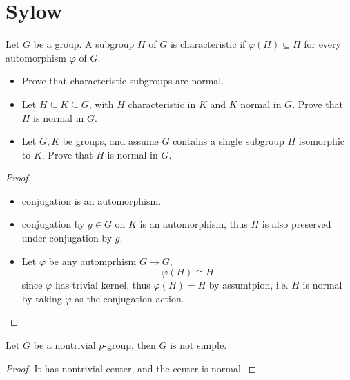 \documentclass[openany]{book}
\begin{document}
\section{Sylow}

\begin{prob}[2.2]
Let \( G \) be a group. A subgroup \( H \) of \( G \) is characteristic if \( \varphi(H) \subseteq H \) for every automorphism \( \varphi \) of \( G \).
\begin{itemize}
    \item Prove that characteristic subgroups are normal.
    \item Let \( H \subseteq K \subseteq G \), with \( H \) characteristic in \( K \) and \( K \) normal in \( G \). Prove that \( H \) is normal in \( G \).
    \item Let \( G, K \) be groups, and assume \( G \) contains a single subgroup \( H \) isomorphic to \( K \). Prove that \( H \) is normal in \( G \).
\end{itemize}
\end{prob}
\begin{proof}
    \begin{itemize}
        \item conjugation is an automorphism.
        \item conjugation by $g\in G$ on $K$ is an automorphism, thus $H$ is also preserved under conjugation by $g$.
        \item Let $\varphi$ be any automprhism $G\to G$, 
        \begin{equation*}
            \varphi(H)\cong H
        \end{equation*}
        since $\varphi$ has trivial kernel, thus $\varphi(H)=H$ by assumtpion, i.e. $H$ is normal by taking $\varphi$ as the conjugation action.
    \end{itemize}
\end{proof}

\begin{prop}
    Let $G$ be a nontrivial $p$-group, then $G$ is not simple.
\end{prop}
\begin{proof}
    It has nontrivial center, and the center is normal.
\end{proof}
\end{document}
